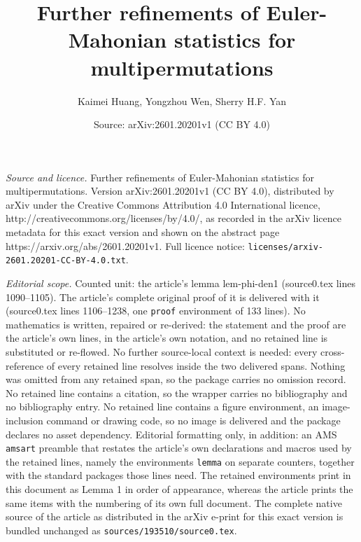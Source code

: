 \documentclass[10pt,a4paper]{amsart}
\title{Further refinements of Euler-Mahonian statistics for multipermutations}
\author{Kaimei Huang, Yongzhou Wen, Sherry H.F. Yan}
\date{Source: arXiv:2601.20201v1 (CC BY 4.0)}
\begin{document}
\maketitle

\noindent\emph{Source and licence.} Further refinements of Euler-Mahonian statistics for multipermutations. Version arXiv:2601.20201v1 (CC BY 4.0), distributed by arXiv under the Creative Commons Attribution 4.0 International licence, http://creativecommons.org/licenses/by/4.0/, as recorded in the arXiv licence metadata for this exact version and shown on the abstract page https://arxiv.org/abs/2601.20201v1. Full licence notice: \texttt{licenses/arxiv-2601.20201-CC-BY-4.0.txt}.\par\smallskip

\noindent\textit{Editorial scope.} Counted unit: the article's lemma lem-phi-den1 (source0.tex lines 1090--1105). The article's complete original proof of it is delivered with it (source0.tex lines 1106--1238, one \texttt{proof} environment of 133 lines). No mathematics is written, repaired or re-derived: the statement and the proof are the article's own lines, in the article's own notation, and no retained line is substituted or re-flowed.  No further source-local context is needed: every cross-reference of every retained line resolves inside the two delivered spans.  Nothing was omitted from any retained span, so the package carries no omission record.  No retained line contains a citation, so the wrapper carries no bibliography and no bibliography entry.  No retained line contains a figure environment, an image-inclusion command or drawing code, so no image is delivered and the package declares no asset dependency.  Editorial formatting only, in addition: an AMS \texttt{amsart} preamble that restates the article's own declarations and macros used by the retained lines, namely the environments \texttt{lemma} on separate counters, together with the standard packages those lines need.  The retained environments print in this document as Lemma 1 in order of appearance, whereas the article prints the same items with the numbering of its own full document.  The complete native source of the article as distributed in the arXiv e-print for this exact version is bundled unchanged as \texttt{sources/193510/source0.tex}.
\end{document}
